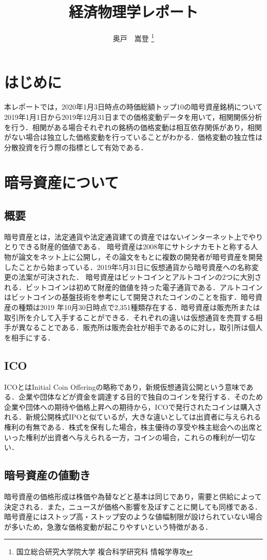 \documentclass{jsarticle}
\title{経済物理学レポート}
\author{奥戸　嵩登 \thanks{国立総合研究大学院大学 複合科学研究科 情報学専攻}}
\begin{document}
	\maketitle
	\section{はじめに}
	本レポートでは，2020年1月3日時点の時価総額トップ10の暗号資産銘柄について2019年1月1日から2019年12月31日までの価格変動データを用いて，相関関係分析を行う．相関がある場合それぞれの銘柄の価格変動は相互依存関係があり，相関がない場合は独立した価格変動を行っていることがわかる．価格変動の独立性は分散投資を行う際の指標として有効である．	
	
	\section{暗号資産について}
	
	\subsection{概要}
	暗号資産とは，法定通貨や法定通貨建ての資産ではないインターネット上でやりとりできる財産的価値である\cite{cryptoassets}．
	暗号資産は2008年にサトシナカモトと称する人物が論文をネット上に公開し，その論文をもとに複数の開発者が暗号資産を開発したことから始まっている．2019年5月31日に仮想通貨から暗号資産への名称変更の法案が可決された．
	暗号資産はビットコインとアルトコインの2つに大別される．ビットコインは初めて財産的価値を持った電子通貨である．アルトコインはビットコインの基盤技術を参考にして開発されたコインのことを指す\cite{alto}．暗号資産の種類は2019 年10月30日時点で2,351種類存在する．暗号資産は販売所または取引所を介して入手することができる．それぞれの違いは仮想通貨を売買する相手が異なることである．販売所は販売会社が相手であるのに対し，取引所は個人を相手にする．
	\subsection{ICO}
	ICOとはInitial Coin Offeringの略称であり，新規仮想通貨公開という意味である．企業や団体などが資金を調達する目的で独自のコインを発行する．そのため企業や団体への期待や価格上昇への期待から，ICOで発行されたコインは購入される．新規公開株式IPOと似ているが，大きな違いとしては出資者に与えられる権利の有無である．株式を保有した場合，株主優待の享受や株主総会への出席といった権利が出資者へ与えられる一方，コインの場合，これらの権利が一切ない\cite{ico}．
	
	\subsection{暗号資産の値動き}
	暗号資産の価格形成は株価や為替などと基本は同じであり，需要と供給によって決定される．また，ニュースが価格へ影響を及ぼすことに関しても同様である．暗号資産にはストップ高・ストップ安のような値幅制限が設けられていない場合が多いため，急激な価格変動が起こりやすいという特徴がある．
	
\end{document}
